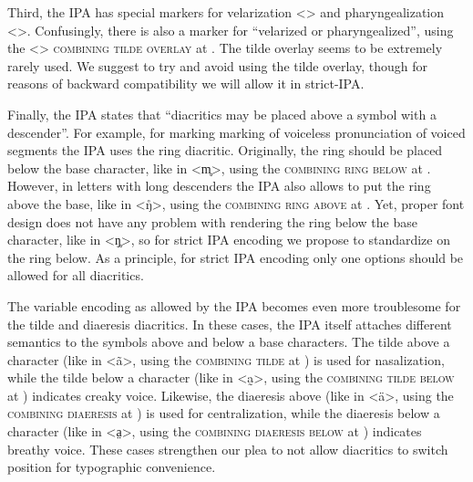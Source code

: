 Third, the IPA has special markers for velarization <> and
pharyngealization <>. Confusingly, there is also a marker for
``velarized or pharyngealized'', using the <> \textsc{combining tilde
overlay} at . The tilde overlay seems to be extremely rarely used. We 
suggest to try and avoid using the tilde overlay, though for reasons of backward 
compatibility we will allow it in strict-IPA.\@

Finally, the IPA states that ``diacritics may be placed above a symbol with a
descender''. For example, for marking marking of voiceless pronunciation of
voiced segments the IPA uses the ring diacritic. Originally, the ring should be
placed below the base character, like in <m̥>, using the \textsc{combining ring
below} at . However, in letters with long descenders the IPA also
allows to put the ring above the base, like in <ŋ̊>, using the \textsc{combining
ring above} at . Yet, proper font design does not have any problem
with rendering the ring below the base character, like in <ŋ̥>, so for strict
IPA encoding we propose to standardize on the ring below. As a principle, for
strict IPA encoding only one options should be allowed for all diacritics.

The variable encoding as allowed by the IPA becomes even more troublesome for
the tilde and diaeresis diacritics. In these cases, the IPA itself attaches
different semantics to the symbols above and below a base characters. The tilde
above a character (like in <ã>, using the \textsc{combining tilde} at
) is used for nasalization, while the tilde below a character (like in
<a̰>, using the \textsc{combining tilde below} at ) indicates creaky
voice. Likewise, the diaeresis above (like in <ä>, using the \textsc{combining
diaeresis} at ) is used for centralization, while the diaeresis below
a character (like in <a̤>, using the \textsc{combining diaeresis below} at
) indicates breathy voice. These cases strengthen our plea to not
allow diacritics to switch position for typographic convenience.




